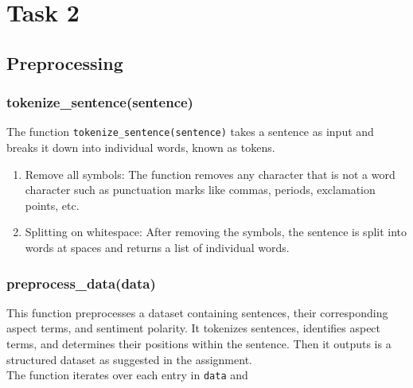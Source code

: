 \documentclass{article}
\begin{document}
\section{Task 2}
\subsection{Preprocessing}
\subsubsection{tokenize\_sentence(sentence)}

The function \texttt{tokenize\_sentence(sentence)} takes a sentence as input and breaks it down into individual words, known as tokens.

\begin{enumerate}
    \item Remove all symbols: The function removes any character that is not a word character such as punctuation marks like commas, periods, exclamation points, etc.

    \item Splitting on whitespace: After removing the symbols, the sentence is split into words at spaces and returns a list of individual words.
\end{enumerate}

\subsubsection{preprocess\_data(data)}
This function preprocesses a dataset containing sentences, their corresponding aspect terms, and sentiment polarity. It tokenizes sentences, identifies aspect terms, and determines their positions within the sentence. Then it outputs is a structured dataset as suggested in the assignment.
\\
\newline
The function iterates over each entry in \texttt{data} and
\end{document}
